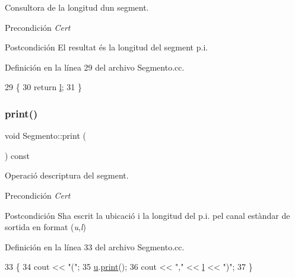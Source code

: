 Consultora de la longitud d\textquotesingle{}un segment. 

\begin{DoxyPrecond}{Precondición}
{\itshape Cert} 
\end{DoxyPrecond}
\begin{DoxyPostcond}{Postcondición}
El resultat és la longitud del segment p.\+i. 
\end{DoxyPostcond}


Definición en la línea 29 del archivo Segmento.\+cc.


\begin{DoxyCode}
29                              \{
30   \textcolor{keywordflow}{return} \hyperlink{class_segmento_a8b59abc9de156b52370dd759beab031d}{l};
31 \}
\end{DoxyCode}
\mbox{\label{class_segmento_ac6f9e53987e915d2d0b6847aeb8e49ed}} 
\subsubsection{\texorpdfstring{print()}{print()}}
{\footnotesize\ttfamily void Segmento\+::print (\begin{DoxyParamCaption}{ }\end{DoxyParamCaption}) const}



Operació d\textquotesingle{}escriptura del segment. 

\begin{DoxyPrecond}{Precondición}
{\itshape Cert} 
\end{DoxyPrecond}
\begin{DoxyPostcond}{Postcondición}
S\textquotesingle{}ha escrit la ubicació i la longitud del p.\+i. pel canal estàndar de sortida en format ({\itshape u},{\itshape l}) 
\end{DoxyPostcond}


Definición en la línea 33 del archivo Segmento.\+cc.


\begin{DoxyCode}
33                            \{
34   cout << \textcolor{stringliteral}{"("};
35   \hyperlink{class_segmento_a7fab9490df9b1b655bb88c2deb6e72ef}{u}.\hyperlink{class_ubicacion_a6b693a32d8bbd9afce30b11d19b68846}{print}();
36   cout << \textcolor{stringliteral}{","} << \hyperlink{class_segmento_a8b59abc9de156b52370dd759beab031d}{l} << \textcolor{stringliteral}{")"};
37 \}
\end{DoxyCode}
\mbox{\label{class_segmento_ad4f75ff368e511884d50866532b3ed2e}} 
